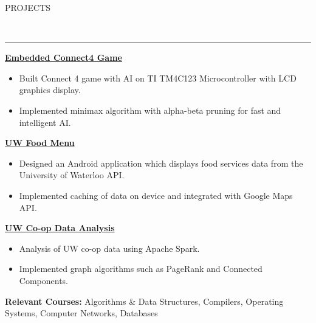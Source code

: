 \documentclass[11pt, letterpaper, oneside]{article}
\newcommand{\HRule}[2]{\textcolor{#1}{\rule{\linewidth}{#2}}}
\newcommand{\sectiontitle}[1]{\begin{minipage}{\textwidth}\vspace{-7.5pt}\begin{flushleft}\hspace{-20.5pt}\vspace{-25pt}
\Large\MakeUppercase{#1}\end{flushleft}\end{minipage}\\\HRule{black}{0.15mm}\vspace{\baselineskip}}
\newenvironment{ressection}[1]{
  \sectiontitle{#1}}
  {\vspace{-\baselineskip}}
\newcommand{\resprojentryheader}[2]{
    \vspace{-6pt}
    \textbf{#1}\hspace{\stretch{1}}\textcolor{black}{#2}\\
}
\newcommand{\resitem}[1]{
    \vspace{2pt}
    \item \begin{flushleft} #1 \end{flushleft}
}
\newenvironment{resprojentry}[2]{
  \begin{minipage}{\textwidth}
  \vspace{-3pt}
    \resprojentryheader{#1}{#2}
        \vspace{-\baselineskip}
     \vspace{-2pt}
    \begin{itemize}[noitemsep,nolistsep]
}{
    \end{itemize}
        \vspace{\baselineskip}
        \end{minipage}
}
\begin{document}
\begin{ressection}{Projects}
  \begin{resprojentry}{\href{https://github.com/coreywu/Connect4}{Embedded Connect4 Game}}{}
    \resitem{Built Connect 4 game with AI on TI TM4C123 Microcontroller with LCD graphics display.}
    \resitem{Implemented minimax algorithm with alpha-beta pruning for fast and intelligent AI.}
    \hspace{-15pt}
  \end{resprojentry}
  \begin{resprojentry}{\href{https://play.google.com/store/apps/details?id=ca.uwaterloo.uwfoodservices&hl=en}{UW Food Menu}}{}
    \resitem{Designed an Android application which displays food services data from the University of Waterloo API.}
    \resitem{Implemented caching of data on device and integrated with Google Maps API.}
    \vspace{2pt} \hspace{-15pt}
  \end{resprojentry}
  \begin{resprojentry}{\href{https://github.com/coreywu/CoopStatsDataAnalysis}{UW Co-op Data Analysis}}{}
    \resitem{Analysis of UW co-op data using Apache Spark.}
    \resitem{Implemented graph algorithms such as PageRank and Connected Components.}
    \vspace{2pt} \hspace{-15pt}
    \vspace{-10pt}
  \end{resprojentry}
  \vspace{-10pt}
  \textbf{Relevant Courses:} Algorithms \& Data Structures, Compilers, Operating Systems, Computer Networks, Databases
\end{ressection}
\end{document}
